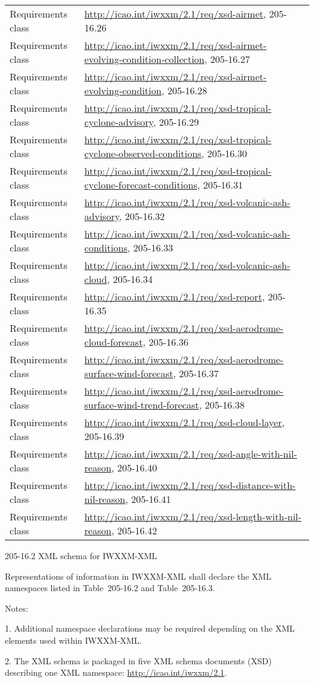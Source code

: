 \begin{longtable}[]{@{}ll@{}}
Requirements class & \url{http://icao.int/iwxxm/2.1/req/xsd-airmet}, 205-16.26\tabularnewline
Requirements class & \url{http://icao.int/iwxxm/2.1/req/xsd-airmet-evolving-condition-collection}, 205‑16.27\tabularnewline
Requirements class & \url{http://icao.int/iwxxm/2.1/req/xsd-airmet-evolving-condition}, 205-16.28\tabularnewline
Requirements class & \url{http://icao.int/iwxxm/2.1/req/xsd-tropical-cyclone-advisory}, 205-16.29\tabularnewline
Requirements class & \url{http://icao.int/iwxxm/2.1/req/xsd-tropical-cyclone-observed-conditions}, 205‑16.30\tabularnewline
Requirements class & \url{http://icao.int/iwxxm/2.1/req/xsd-tropical-cyclone-forecast-conditions}, 205‑16.31\tabularnewline
Requirements class & \url{http://icao.int/iwxxm/2.1/req/xsd-volcanic-ash-advisory}, 205-16.32\tabularnewline
Requirements class & \url{http://icao.int/iwxxm/2.1/req/xsd-volcanic-ash-conditions}, 205-16.33\tabularnewline
Requirements class & \url{http://icao.int/iwxxm/2.1/req/xsd-volcanic-ash-cloud}, 205-16.34\tabularnewline
Requirements class & \url{http://icao.int/iwxxm/2.1/req/xsd-report}, 205-16.35\tabularnewline
Requirements class & \url{http://icao.int/iwxxm/2.1/req/xsd-aerodrome-cloud-forecast}, 205-16.36\tabularnewline
Requirements class & \url{http://icao.int/iwxxm/2.1/req/xsd-aerodrome-surface-wind-forecast}, 205-16.37\tabularnewline
Requirements class & \url{http://icao.int/iwxxm/2.1/req/xsd-aerodrome-surface-wind-trend-forecast}, 205-16.38\tabularnewline
Requirements class & \url{http://icao.int/iwxxm/2.1/req/xsd-cloud-layer}, 205-16.39\tabularnewline
Requirements class & \url{http://icao.int/iwxxm/2.1/req/xsd-angle-with-nil-reason}, 205-16.40\tabularnewline
Requirements class & \url{http://icao.int/iwxxm/2.1/req/xsd-distance-with-nil-reason}, 205-16.41\tabularnewline
Requirements class & \url{http://icao.int/iwxxm/2.1/req/xsd-length-with-nil-reason}, 205-16.42\tabularnewline
\bottomrule
\end{longtable}

205-16.2 XML schema for IWXXM-XML

Representations of information in IWXXM-XML shall declare the XML namespaces listed in Table~205-16.2 and Table~205-16.3.

Notes:

1. Additional namespace declarations may be required depending on the XML elements used within IWXXM‑XML.

2. The XML schema is packaged in five XML schema documents (XSD) describing one XML namespace: \url{http://icao.int/iwxxm/2.1}.

